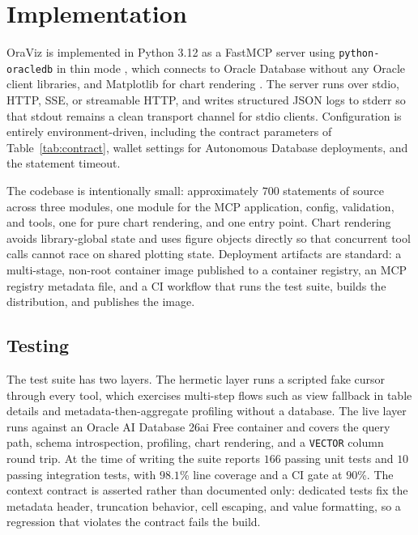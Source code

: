 \section{Implementation}\label{sec:implementation}

OraViz is implemented in Python 3.12 as a FastMCP server \cite{fastmcp2025} using \texttt{python-oracledb} in thin mode \cite{pythonoracledb}, which connects to Oracle Database without any Oracle client libraries, and Matplotlib for chart rendering \cite{hunter2007matplotlib}. The server runs over stdio, HTTP, SSE, or streamable HTTP, and writes structured JSON logs to stderr so that stdout remains a clean transport channel for stdio clients. Configuration is entirely environment-driven, including the contract parameters of Table~\ref{tab:contract}, wallet settings for Autonomous Database deployments, and the statement timeout.

The codebase is intentionally small: approximately $700$ statements of source across three modules, one module for the MCP application, config, validation, and tools, one for pure chart rendering, and one entry point. Chart rendering avoids library-global state and uses figure objects directly so that concurrent tool calls cannot race on shared plotting state. Deployment artifacts are standard: a multi-stage, non-root container image published to a container registry, an MCP registry metadata file, and a CI workflow that runs the test suite, builds the distribution, and publishes the image.

\subsection{Testing}

The test suite has two layers. The hermetic layer runs a scripted fake cursor through every tool, which exercises multi-step flows such as view fallback in table details and metadata-then-aggregate profiling without a database. The live layer runs against an Oracle AI Database 26ai Free container and covers the query path, schema introspection, profiling, chart rendering, and a \texttt{VECTOR} column round trip. At the time of writing the suite reports $166$ passing unit tests and $10$ passing integration tests, with $98.1$\% line coverage and a CI gate at $90$\%. The context contract is asserted rather than documented only: dedicated tests fix the metadata header, truncation behavior, cell escaping, and value formatting, so a regression that violates the contract fails the build.

